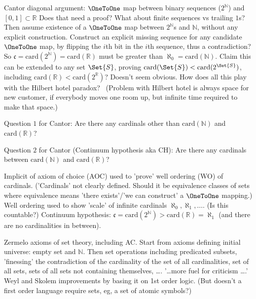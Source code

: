 Cantor diagonal argument:
\hfill\break
$\OneToOne$ map between binary sequences ($2^{\mathbb{N}}$)
and $[0,1]\subset\mathbb{R}$
Does that need a proof?
What about finite sequences vs trailing $1$s? 
\hfill\break
Then assume existence of a $\OneToOne$  
map between $2^{\mathbb{N}}$s 
and $\mathbb{N}$,
without any explicit construction.
Construct an explicit missing sequence 
for any candidate $\OneToOne$ map,
by flipping the $i$th bit in the $i$th sequence,
thus a contradiction?
So $\mathfrak{c} = \mathrm{card}(2^{\mathbb{N}}) 
= \mathrm{card}(\mathbb{R})$ must be greater than 
$\aleph_0 = \mathrm{card}(\mathbb{N})$. 
\hfill\break
Claim this can be extended to any set $\Set{S}$,
proving 
$\mathrm{card}(\Set{S}) < \mathrm{card}(2^{\Set{S}})$,
including 
$\mathrm{card}(\mathbb{R}) < \mathrm{card}(2^{\mathbb{R}})$?
Doesn't seem obvious.
\hfill\break
How does all this play with 
the Hilbert hotel paradox?~\cite{wiki:Hilbert_hotel}
(Problem with Hilbert hotel is 
always space for new customer, if everybody moves one room up,
but infinite time required to make that space.)

Question $1$ for Cantor:
\hfill\break
Are there any cardinals other than 
$\mathrm{card}(\mathbb{N})$ and 
$\mathrm{card}(\mathbb{R})$?

Question $2$ for Cantor (Continuum hypothesis aka CH):
\hfill\break
Are there any cardinals between
$\mathrm{card}(\mathbb{N})$ and 
$\mathrm{card}(\mathbb{R})$?

Implicit of axiom of choice (AOC) used to 'prove' 
well ordering (WO) of cardinals.
('Cardinals' not clearly defined.
Should it be equivalence classes of sets where
equivalence means 'there exists'/'we can construct'
a $\OneToOne$ mapping.)
\hfill\break
Well ordering used to show 'scale' of infinite cardinals
$\aleph_0, \aleph_1, \ldots$. (Is this countable?)
\hfill\break
Continuum hypothesis: 
$\mathfrak{c} = \mathrm{card}(2^{\mathbb{N}}) 
> \mathrm{card}(\mathbb{R}) = \aleph_1$
(and there are no cardinalities in between).

Zermelo axioms of set theory, including AC.
Start from axioms defining initial universe:
empty set and $\mathbb{N}$.
Then set operations including predicated subsets,
'finessing' the contradiction of the
cardinality of the set of all cardinalities,
set of all sets,
sets of all sets not containing themselves, 
\ldots.
\hfill\break
'\ldots more fuel for criticism \ldots.'
Weyl and Skolem improvements by basing it on 1st order logic.
(But doesn't a first order language require sets,
eg, a set of atomic symbols?)

